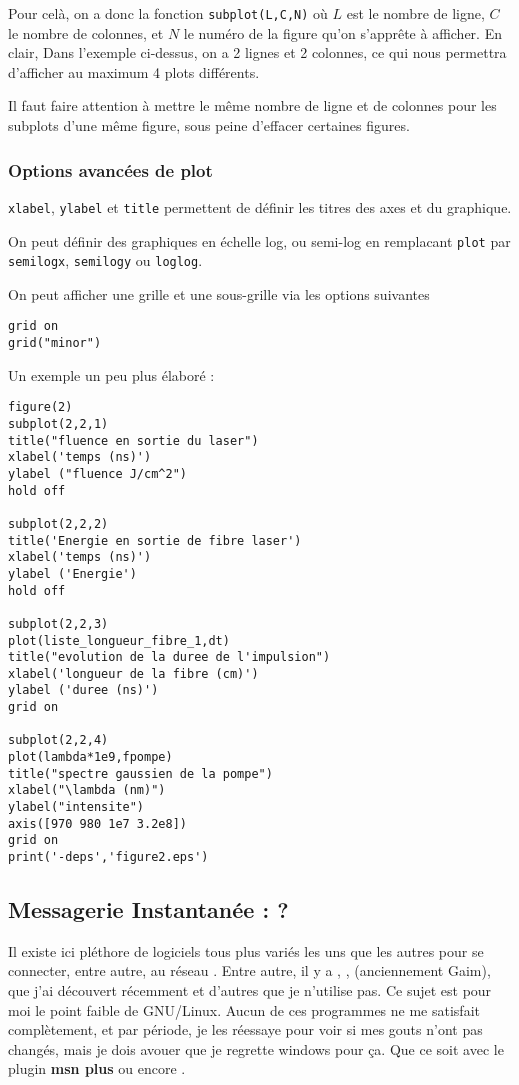 \documentclass[a4paper,twoside]{article}
\begin{document}
Pour celà, on a donc la fonction \verb|subplot(L,C,N)| où $L$ est le nombre de ligne, $C$ le nombre de colonnes, et $N$ le numéro de la figure qu'on s'apprête à afficher. En clair, Dans l'exemple ci-dessus, on a 2 lignes et 2 colonnes, ce qui nous permettra d'afficher au maximum 4 plots différents.

\begin{attention}
Il faut faire attention à mettre le même nombre de ligne et de colonnes pour les subplots d'une même figure, sous peine d'effacer certaines figures.
\end{attention}

\subsubsection{Options avancées de plot}
\texttt{xlabel}, \texttt{ylabel} et \texttt{title} permettent de définir les titres des axes et du graphique.

On peut définir des graphiques en échelle log, ou semi-log en remplacant \texttt{plot} par \texttt{semilogx}, \texttt{semilogy} ou \texttt{loglog}.

On peut afficher une grille et une sous-grille via les options suivantes
\begin{verbatim}
grid on
grid("minor")
\end{verbatim}

Un exemple un peu plus élaboré :
\begin{verbatim}
figure(2)
subplot(2,2,1)
title("fluence en sortie du laser")
xlabel('temps (ns)')
ylabel ("fluence J/cm^2")
hold off

subplot(2,2,2)
title('Energie en sortie de fibre laser')
xlabel('temps (ns)')
ylabel ('Energie')
hold off

subplot(2,2,3)
plot(liste_longueur_fibre_1,dt)
title("evolution de la duree de l'impulsion")
xlabel('longueur de la fibre (cm)')
ylabel ('duree (ns)')
grid on

subplot(2,2,4)
plot(lambda*1e9,fpompe)
title("spectre gaussien de la pompe")
xlabel("\lambda (nm)")
ylabel("intensite")
axis([970 980 1e7 3.2e8])
grid on
print('-deps','figure2.eps')
\end{verbatim}



\subsection{Messagerie Instantanée : ?}
Il existe ici pléthore de logiciels tous plus variés les uns que les autres pour se connecter, entre autre, au réseau . Entre autre, il y a , ,  (anciennement Gaim),  que j'ai découvert récemment et d'autres que je n'utilise pas. Ce sujet est pour moi le point faible de GNU/Linux. Aucun de ces programmes ne me satisfait complètement, et par période, je les réessaye pour voir si mes gouts n'ont pas changés, mais je dois avouer que je regrette windows pour ça. Que ce soit  avec le plugin \textbf{msn plus} ou encore .
\end{document}
